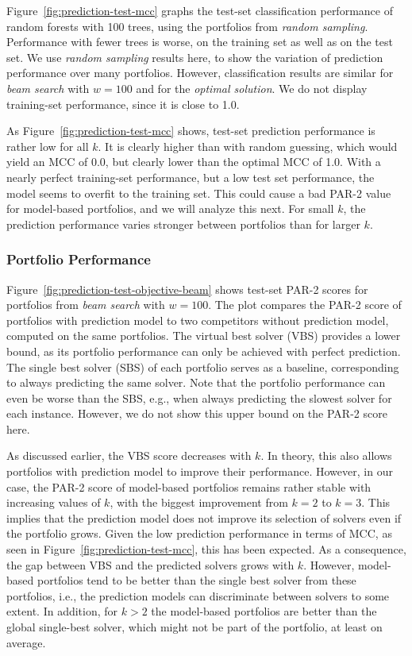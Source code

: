 \documentclass[conference]{IEEEtran}
\begin{document}
Figure~\ref{fig:prediction-test-mcc} graphs the test-set classification performance of random forests with 100 trees, using the portfolios from \emph{random sampling}.
Performance with fewer trees is worse, on the training set as well as on the test set.
We use \emph{random sampling} results here, to show the variation of prediction performance over many portfolios.
However, classification results are similar for \emph{beam search} with $w=100$ and for the \emph{optimal solution}.
We do not display training-set performance, since it is close to 1.0.

As Figure~\ref{fig:prediction-test-mcc} shows, test-set prediction performance is rather low for all $k$.
It is clearly higher than with random guessing, which would yield an MCC of 0.0, but clearly lower than the optimal MCC of 1.0.
With a nearly perfect training-set performance, but a low test set performance, the model seems to overfit to the training set.
This could cause a bad \mbox{PAR-2} value for model-based portfolios, and we will analyze this next.
For small $k$, the prediction performance varies stronger between portfolios than for larger $k$.

\subsubsection{Portfolio Performance}

Figure~\ref{fig:prediction-test-objective-beam} shows test-set PAR-2 scores for portfolios from \emph{beam search} with $w=100$.
The plot compares the PAR-2 score of portfolios with prediction model to two competitors without prediction model, computed on the same portfolios.
The virtual best solver (VBS) provides a lower bound, as its portfolio performance can only be achieved with perfect prediction.
The single best solver (SBS) of each portfolio serves as a baseline, corresponding to always predicting the same solver.
Note that the portfolio performance can even be worse than the SBS, e.g., when always predicting the slowest solver for each instance.
However, we do not show this upper bound on the PAR-2 score here.

As discussed earlier, the VBS score decreases with $k$.
In theory, this also allows portfolios with prediction model to improve their performance.
However, in our case, the \mbox{PAR-2} score of model-based portfolios remains rather stable with increasing values of $k$, with the biggest improvement from $k=2$ to $k=3$.
This implies that the prediction model does not improve its selection of solvers even if the portfolio grows.
Given the low prediction performance in terms of MCC, as seen in Figure~\ref{fig:prediction-test-mcc}, this has been expected.
As a consequence, the gap between VBS and the predicted solvers grows with $k$.
However, model-based portfolios tend to be better than the single best solver from these portfolios, i.e., the prediction models can discriminate between solvers to some extent.
In addition, for $k > 2$ the model-based portfolios are better than the global single-best solver, which might not be part of the portfolio, at least on average.
\end{document}
